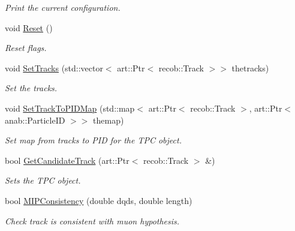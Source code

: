 \begin{DoxyCompactItemize}
\begin{DoxyCompactList}\small\item\em Print the current configuration. \end{DoxyCompactList}\item 
\hypertarget{classubana_1_1MuonCandidateFinder_a946f1adda03992caa715afaac8519a7d}{void \hyperlink{classubana_1_1MuonCandidateFinder_a946f1adda03992caa715afaac8519a7d}{Reset} ()}\label{classubana_1_1MuonCandidateFinder_a946f1adda03992caa715afaac8519a7d}

\begin{DoxyCompactList}\small\item\em Reset flags. \end{DoxyCompactList}\item 
\hypertarget{classubana_1_1MuonCandidateFinder_a1cdd1745117a85bbcfc1de5167c7e688}{void \hyperlink{classubana_1_1MuonCandidateFinder_a1cdd1745117a85bbcfc1de5167c7e688}{Set\-Tracks} (std\-::vector$<$ art\-::\-Ptr$<$ recob\-::\-Track $>$$>$ thetracks)}\label{classubana_1_1MuonCandidateFinder_a1cdd1745117a85bbcfc1de5167c7e688}

\begin{DoxyCompactList}\small\item\em Set the tracks. \end{DoxyCompactList}\item 
\hypertarget{classubana_1_1MuonCandidateFinder_adc3333300fec98b692ff12550c3d8d53}{void \hyperlink{classubana_1_1MuonCandidateFinder_adc3333300fec98b692ff12550c3d8d53}{Set\-Track\-To\-P\-I\-D\-Map} (std\-::map$<$ art\-::\-Ptr$<$ recob\-::\-Track $>$, art\-::\-Ptr$<$ anab\-::\-Particle\-I\-D $>$$>$ themap)}\label{classubana_1_1MuonCandidateFinder_adc3333300fec98b692ff12550c3d8d53}

\begin{DoxyCompactList}\small\item\em Set map from tracks to P\-I\-D for the T\-P\-C object. \end{DoxyCompactList}\item 
\hypertarget{classubana_1_1MuonCandidateFinder_a8f852194c03bf0b3c04650850271c7d9}{bool \hyperlink{classubana_1_1MuonCandidateFinder_a8f852194c03bf0b3c04650850271c7d9}{Get\-Candidate\-Track} (art\-::\-Ptr$<$ recob\-::\-Track $>$ \&)}\label{classubana_1_1MuonCandidateFinder_a8f852194c03bf0b3c04650850271c7d9}

\begin{DoxyCompactList}\small\item\em Sets the T\-P\-C object. \end{DoxyCompactList}\item 
\hypertarget{classubana_1_1MuonCandidateFinder_af622d542c3c3932572dc67588e75bcf6}{bool \hyperlink{classubana_1_1MuonCandidateFinder_af622d542c3c3932572dc67588e75bcf6}{M\-I\-P\-Consistency} (double dqds, double length)}\label{classubana_1_1MuonCandidateFinder_af622d542c3c3932572dc67588e75bcf6}

\begin{DoxyCompactList}\small\item\em Check track is consistent with muon hypothesis. \end{DoxyCompactList}\end{DoxyCompactItemize}
